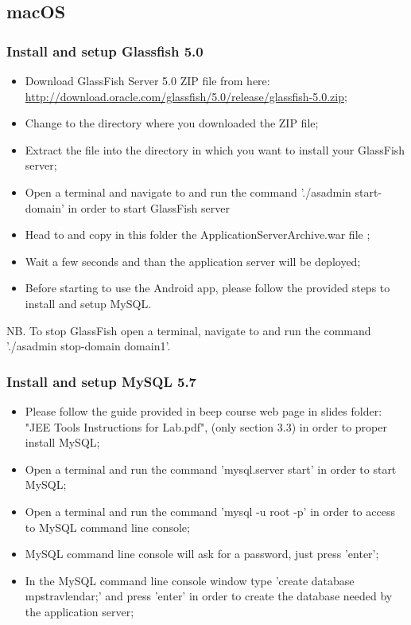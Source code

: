 \subsection{macOS}
\label{subsect:macOS}

\subsubsection{Install and setup Glassfish 5.0}
\begin{itemize}
	\item Download GlassFish Server 5.0 ZIP file from here: \\ \href{http://download.oracle.com/glassfish/5.0/release/glassfish-5.0.zip}{\color{blue}http://download.oracle.com/glassfish/5.0/release/glassfish-5.0.zip};
	\item Change to the directory where you downloaded the ZIP file;
	\item Extract the file into the directory in which you want to install your GlassFish server;
	\item Open a terminal and navigate to  and run the command './asadmin start-domain' in order to start GlassFish server
	\item Head to  and copy in this folder the ApplicationServerArchive.war file ;
	\item Wait a few seconds and than the application server will be deployed;
	\item Before starting to use the Android app, please follow the provided steps to install and setup MySQL.
\end{itemize}
NB. To stop GlassFish open a terminal, navigate to  and run the command './asadmin stop-domain domain1'.

\subsubsection{Install and setup MySQL 5.7}
\begin{itemize}
	\item Please follow the guide provided in beep course web page in slides folder: "JEE Tools Instructions for Lab.pdf", (only section 3.3) in order to proper install MySQL;
	\item Open a terminal and run the command 'mysql.server start' in order to start MySQL;
	\item Open a terminal and run the command 'mysql -u root -p' in order to access to MySQL command line console;
	\item MySQL command line console will ask for a password, just press 'enter';
	\item In the MySQL command line console window type 'create database mps\textunderscore travlendar;' and press 'enter' in order to create the database needed by the application server;
\end{itemize}

